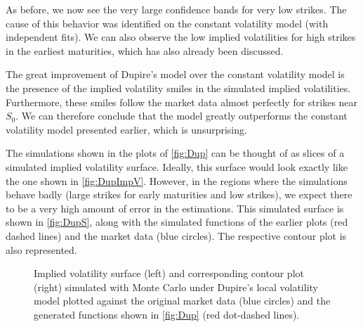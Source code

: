 As before, we now see the very large confidence bands for very low strikes. The cause of this behavior was identified on the constant volatility model (with independent fits). We can also observe the low implied volatilities for high strikes in the earliest maturities, which has also already been discussed.

The great improvement of Dupire's model over the constant volatility model is the presence of the implied volatility smiles in the simulated implied volatilities. Furthermore, these smiles follow the market data almost perfectly for strikes near $S_0$.
We can therefore conclude that the model greatly outperforms the constant volatility model presented earlier, which is unsurprising.

The simulations shown in the plots of \autoref{fig:Dup} can be thought of as slices of a simulated implied volatility surface. Ideally, this surface would look exactly like the one shown in \autoref{fig:DupImpV}. However, in the regions where the simulations behave badly (large strikes for early maturities and low strikes), we expect there to be a very high amount of error in the estimations. This simulated surface is shown in \autoref{fig:DupS}, along with the simulated functions of the earlier plots (red dashed lines) and the market data (blue circles). The respective contour plot is also represented.


\vspace{\fill}
\newpage

\begin{figure}[H]
  \begin{subfigmatrix}{2}
  \end{subfigmatrix}
    \caption[Implied volatility surface and corresponding contour plot simulated with Monte Carlo under Dupire's local volatility model plotted against the original market data and the generated functions shown in \autoref{fig:Dup}.]{Implied volatility surface (left) and corresponding contour plot (right) simulated with Monte Carlo under Dupire's local volatility model plotted against the original market data (blue circles) and the generated functions shown in \autoref{fig:Dup} (red dot-dashed lines).}\label{fig:DupS}
\end{figure}   


